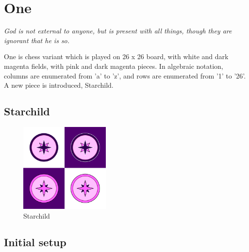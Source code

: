 \documentclass[a5paper,12pt,draft]{book} %
\begin{document}
\clearpage

\chapter*{One}

\begin{flushright}
\parbox{0.8\textwidth}{
\emph{God is not external to anyone, but is present with all things, though
they are ignorant that he is so. \\
 } }
\end{flushright}

One is chess variant which is played on 26 x 26 board, with white
and dark magenta fields, with pink and dark magenta pieces. In
algebraic notation, columns are enumerated from 'a' to 'z', and
rows are enumerated from '1' to '26'. A new piece is introduced,
Starchild.

\clearpage

\section*{Starchild}

\noindent
\begin{figure}
\includegraphics[width=0.4\textwidth, keepaspectratio=true]{../gfx/pieces/16_starchild.png}
\caption{Starchild}
\label{fig:starchild}
\end{figure}

\clearpage

\section*{Initial setup}
\end{document}
